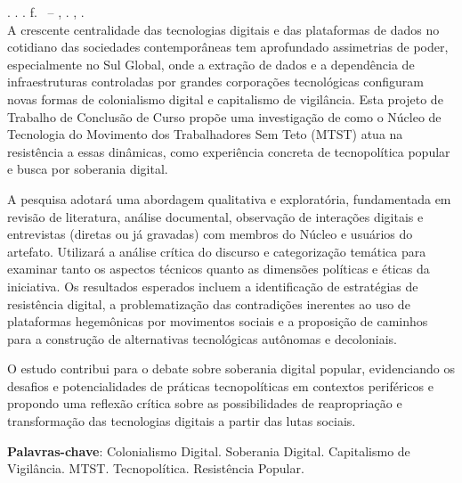 
\begin{resumo}[RESUMO]
\begin{SingleSpacing}

\imprimirautorcitacao. \imprimirtitulo. \imprimirdata. \pageref {LastPage} f. \imprimirprojeto\ – \imprimirprograma, \imprimirinstituicao. \imprimirlocal, \imprimirdata.\\

A crescente centralidade das tecnologias digitais e das plataformas de dados no cotidiano das sociedades contemporâneas tem aprofundado assimetrias de poder, especialmente no Sul Global, onde a extração de dados e a dependência de infraestruturas controladas por grandes corporações tecnológicas configuram novas formas de colonialismo digital e capitalismo de vigilância. Esta projeto de Trabalho de Conclusão de Curso propõe uma investigação de como o Núcleo de Tecnologia do Movimento dos Trabalhadores Sem Teto (MTST) atua na resistência a essas dinâmicas, como experiência concreta de tecnopolítica popular e busca por soberania digital.

A pesquisa adotará uma abordagem qualitativa e exploratória, fundamentada em revisão de literatura, análise documental, observação de interações digitais e entrevistas (diretas ou já gravadas) com membros do Núcleo e usuários do artefato. Utilizará a análise crítica do discurso e categorização temática para examinar tanto os aspectos técnicos quanto as dimensões políticas e éticas da iniciativa. Os resultados esperados incluem a identificação de estratégias de resistência digital, a problematização das contradições inerentes ao uso de plataformas hegemônicas por movimentos sociais e a proposição de caminhos para a construção de alternativas tecnológicas autônomas e decoloniais.

O estudo contribui para o debate sobre soberania digital popular, evidenciando os desafios e potencialidades de práticas tecnopolíticas em contextos periféricos e propondo uma reflexão crítica sobre as possibilidades de reapropriação e transformação das tecnologias digitais a partir das lutas sociais.

\textbf{Palavras-chave}: Colonialismo Digital. Soberania Digital. Capitalismo de Vigilância. MTST. Tecnopolítica. Resistência Popular.
\end{SingleSpacing}
\end{resumo}


